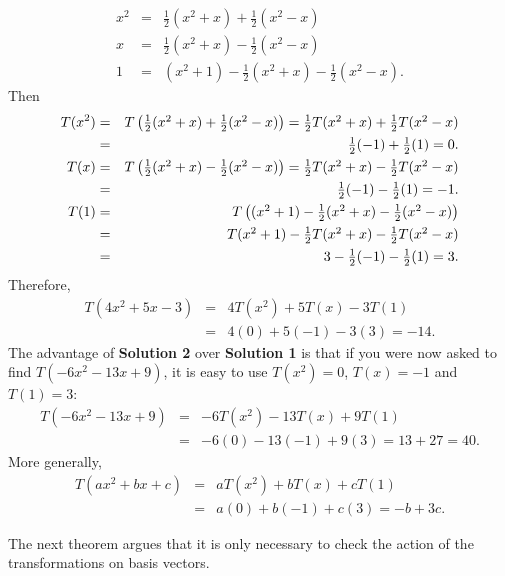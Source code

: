 \begin{solution}
  \begin{eqnarray*}
    x^2 & = & \textstyle \frac{1}{2}(x^2+x) + \frac{1}{2}(x^2-x) \\
    x & = & \textstyle \frac{1}{2}(x^2+x) - \frac{1}{2}(x^2-x) \\
    1 & = & (x^2+1)-\textstyle \frac{1}{2}(x^2+x) - \frac{1}{2}(x^2-x).
  \end{eqnarray*}
  Then
  \begin{eqnarray*}
    T(x^2)
    & = & \textstyle T\left(\frac{1}{2}(x^2+x) + \frac{1}{2}(x^2-x)\right)
          =\frac{1}{2}T(x^2+x) + \frac{1}{2}T(x^2-x)\\
    & = & \textstyle \frac{1}{2}(-1) + \frac{1}{2}(1) = 0.  \\
    T(x)
    & = & \textstyle T\left(\frac{1}{2}(x^2+x) - \frac{1}{2}(x^2-x)\right)
          = \frac{1}{2}T(x^2+x) - \frac{1}{2}T(x^2-x) \\
    & = & \textstyle \frac{1}{2}(-1) - \frac{1}{2}(1) = -1.\\
    T(1)
    & = & \textstyle T\left((x^2+1)-\frac{1}{2}(x^2+x) -
          \frac{1}{2}(x^2-x)\right)\\
    & = & \textstyle T(x^2+1)-\frac{1}{2}T(x^2+x) - \frac{1}{2}T(x^2-x) \\
    & = & \textstyle 3-\frac{1}{2}(-1) - \frac{1}{2}(1) = 3.
  \end{eqnarray*}
  Therefore,
  \begin{eqnarray*}
    T(4x^2+5x-3) & = & 4T(x^2) + 5T(x) -3T(1) \\
                 & = & 4(0) + 5(-1) - 3(3)=-14.
  \end{eqnarray*}
  The advantage of \textbf{Solution 2} over \textbf{Solution 1} is
  that if you were now asked to find $T(-6x^2-13x+9)$, it is easy to
  use $T(x^2)=0$, $T(x)=-1$ and $T(1)= 3$:
  \begin{eqnarray*}
    T(-6x^2-13x+9) & = & -6T(x^2)-13T(x)+9T(1) \\
                   & = & -6(0)-13(-1)+9(3)=13+27=40.
  \end{eqnarray*}
  More generally,
  \begin{eqnarray*}
    T(ax^2+bx+c) & = & aT(x^2)+bT(x)+cT(1) \\
                 & = & a(0)+b(-1)+c(3)=-b+3c.
  \end{eqnarray*}
\end{solution}

The next theorem argues that it is only necessary to check the action
of the transformations on basis vectors.

